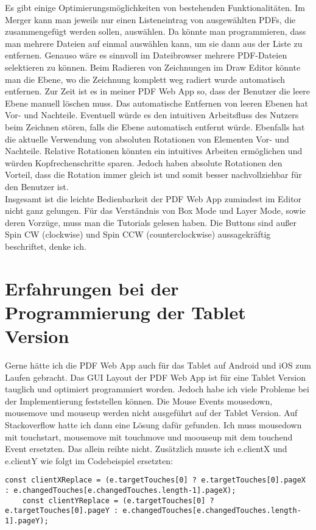 Es gibt einige Optimierungsmöglichkeiten von bestehenden Funktionalitäten. Im Merger kann man jeweils nur einen Listeneintrag von ausgewählten PDFs, die zusammengefügt werden sollen, auswählen. Da könnte man programmieren, dass man mehrere Dateien auf einmal auswählen kann, um sie dann aus der Liste zu entfernen. Genauso wäre es sinnvoll im Dateibrowser mehrere PDF-Dateien selektieren zu können. Beim Radieren von Zeichnungen im Draw Editor könnte man die Ebene, wo die Zeichnung komplett weg radiert wurde automatisch entfernen. Zur Zeit ist es in meiner PDF Web App so, dass der Benutzer die leere Ebene manuell löschen muss. Das automatische Entfernen von leeren Ebenen hat Vor- und Nachteile. Eventuell würde es den intuitiven Arbeitsfluss des Nutzers beim Zeichnen stören, falls die Ebene automatisch entfernt würde. Ebenfalls hat die aktuelle Verwendung von absoluten Rotationen von Elementen Vor- und Nachteile. Relative Rotationen könnten ein intuitives Arbeiten ermöglichen und würden Kopfrechenschritte sparen. Jedoch haben absolute Rotationen den Vorteil, dass die Rotation immer gleich ist und somit besser nachvollziehbar für den Benutzer ist. \\
Insgesamt ist die leichte Bedienbarkeit der PDF Web App zumindest im Editor nicht ganz gelungen. Für das Verständnis von Box Mode und Layer Mode, sowie deren Vorzüge, muss man die Tutorials gelesen haben. Die Buttons sind außer Spin CW (clockwise) und Spin CCW (counterclockwise) aussagekräftig beschriftet, denke ich. 

\section{Erfahrungen bei der Programmierung der Tablet Version}
Gerne hätte ich die PDF Web App auch für das Tablet auf Android und iOS zum Laufen gebracht. Das GUI Layout der PDF Web App ist für eine Tablet Version tauglich und optimiert programmiert worden. Jedoch habe ich viele Probleme bei der Implementierung feststellen können. Die Mouse Events mousedown, mousemove und mouseup werden nicht ausgeführt auf der Tablet Version. Auf Stackoverflow hatte ich dann eine Lösung dafür gefunden. Ich muss mousedown mit touchstart, mousemove mit touchmove und moouseup mit dem touchend Event ersetzten. Das allein reihte nicht. Zusätzlich musste ich e.clientX und e.clientY wie folgt im Codebeispiel ersetzten:

\begin{lstlisting}[caption=e.clientX und e.clientY Ersetzung]
	const clientXReplace = (e.targetTouches[0] ? e.targetTouches[0].pageX : e.changedTouches[e.changedTouches.length-1].pageX);
	const clientYReplace = (e.targetTouches[0] ? e.targetTouches[0].pageY : e.changedTouches[e.changedTouches.length-1].pageY);
\end{lstlisting} 




